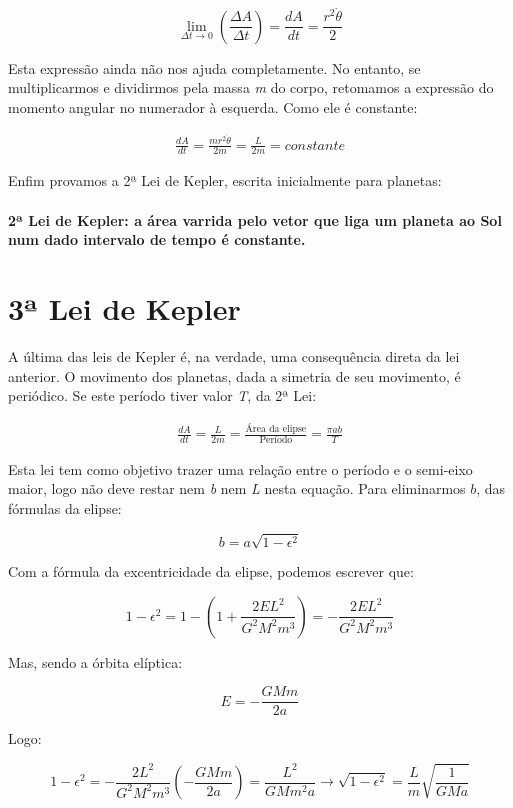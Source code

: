 \[
	\lim_{\Delta t \rightarrow 0}\left({\frac{\Delta A}{\Delta t}}\right) = \frac{dA}{dt} = \frac{r^2\dot{\theta}}{2}
\]

Esta expressão ainda não nos ajuda completamente. No entanto, se multiplicarmos e dividirmos pela massa \textit{m} do corpo, retomamos a expressão do momento angular no numerador à esquerda. Como ele é constante:

\begin{eqnarray}
	\frac{dA}{dt} = \frac{mr^2\dot{\theta}}{2m} = \frac{L}{2m} = constante \label{eq55}
\end{eqnarray}

Enfim provamos a 2ª Lei de Kepler, escrita inicialmente para planetas:{\\}{\\}
\textbf{\Large{2ª Lei de Kepler: a área varrida pelo vetor que liga um planeta ao Sol num dado intervalo de tempo é constante.}} {\\}

\section{3ª Lei de Kepler}

A última das leis de Kepler é, na verdade, uma consequência direta da lei anterior. O movimento dos planetas, dada a simetria de seu movimento, é periódico. Se este período tiver valor \textit{T}, da 2ª Lei:

\begin{eqnarray}
	\frac{dA}{dt} = \frac{L}{2m} = \frac{\text{Área da elipse}}{\text{Período}} = \frac{\pi ab}{T} \label{eq56}
\end{eqnarray}

Esta lei tem como objetivo trazer uma relação entre o período e o semi-eixo maior, logo não deve restar nem \textit{b} nem \textit{L} nesta equação. Para eliminarmos $b$, das fórmulas da elipse:

\[
	b = a\sqrt{1 - \epsilon^2}
\]

Com a fórmula da excentricidade da elipse, podemos escrever que:

\[
	1 - \epsilon^2 = 1 - \left(1 + \frac{2EL^2}{G^2M^2m^3}\right) = - \frac{2EL^2}{G^2M^2m^3}
\]

Mas, sendo a órbita elíptica:

\[
	E = -\frac{GMm}{2a}
\]

Logo:

\[
	1 - \epsilon^2 = -\frac{2L^2}{G^2M^2m^3}\left(-\frac{GMm}{2a}\right) = \frac{L^2}{GMm^2a} \rightarrow \sqrt{1-\epsilon^2} = \frac{L}{m}\sqrt{\frac{1}{GMa}}
\]{\\}

